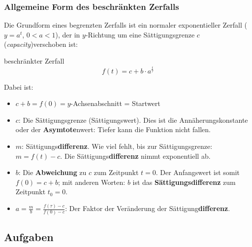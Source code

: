 \subsubsection{Allgemeine Form des beschränkten Zerfalls}
\begin{center}
\end{center}

Die Grundform eines begrenzten Zerfalls ist ein normaler
exponentieller Zerfall ($y=a^{t}$, $0<a<1$), der in $y$-Richtung um
eine Sättigungsgrenze $c$
(\textit{capacity})verschoben ist:

\begin{definition}{beschränkter Zerfall}{}
$$f(t) = c + b\cdot{}a^{\frac{t}{\tau}}$$
\end{definition}

Dabei ist:
\begin{itemize}
  \item $c+b = f(0) = y$-Achsenabschnitt = Startwert
	\item $c$: Die Sättigungsgrenze (Sättigungswert). Dies ist die Annäherungskonstante oder der \textbf{Asymtote}nwert: Tiefer kann die Funktion nicht fallen.

	\item $m$:
    Sättigungs\textbf{differenz}. Wie viel fehlt, bis zur
    Sättigungsgrenze: $m = f(t) - c$. Die Sättigungs\textbf{differenz} nimmt exponentiell ab.
	\item $b$: Die \textbf{Abweichung} zu $c$ zum Zeitpunkt $t=0$. Der
    Anfangswert ist somit $f(0) = c + b$; mit anderen Worten: $b$ ist das
    \textbf{Sättigungsdifferenz} zum Zeitpunkt $t_0 = 0$.

    \item $a=\frac{m}{b}=\frac{f(\tau)-c}{f(0)-c}$: Der Faktor der Veränderung der
      Sättigung\textbf{differenz}.
\end{itemize}

\subsection*{Aufgaben}


